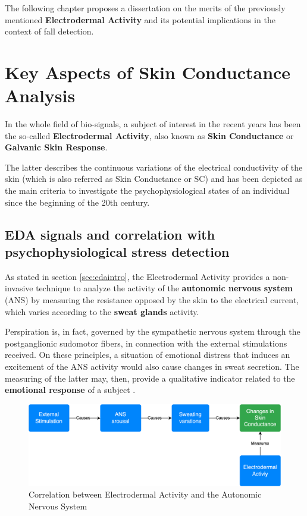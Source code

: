 \label{ch:eda-chapter}

The following chapter proposes a dissertation on the merits of the previously mentioned \textbf{Electrodermal Activity} and its potential implications in the context of fall detection.

\section{Key Aspects of Skin Conductance Analysis}\label{sec:eda-description}

In the whole field of bio-signals, a subject of interest in the recent years has been the so-called \textbf{Electrodermal Activity}, also known as \textbf{Skin Conductance} or \textbf{Galvanic Skin Response}.

The latter describes the continuous variations of the electrical conductivity of the skin (which is also referred as Skin Conductance or SC) and has been depicted as the main criteria to investigate the psychophysiological states of an individual since the beginning of the 20th century.

\subsection{EDA signals and correlation with psychophysiological stress detection}\label{subsec:eda-signals}

As stated in section \ref{sec:edaintro}, the Electrodermal Activity provides a non-invasive technique to analyze the activity of the \textbf{autonomic nervous system} (ANS) by measuring the resistance opposed by the skin to the electrical current, which varies according to the \textbf{sweat glands} activity.

Perspiration is, in fact, governed by the sympathetic nervous system \cite{bartholomew} through the postganglionic sudomotor fibers, in connection with the external stimulations received. On these principles, a situation of emotional distress that induces an excitement of the ANS activity would also cause changes in sweat secretion. The measuring of the latter may, then, provide a qualitative indicator related to the \textbf{emotional response} of a subject \cite{carlson}.

\begin{figure}[h]
    \centering
    \includegraphics[width=\textwidth]{./images/eda-cause-effect.drawio.png}
    \caption{Correlation between Electrodermal Activity and the Autonomic Nervous System}
    \label{fig:eda-ans}
\end{figure}

